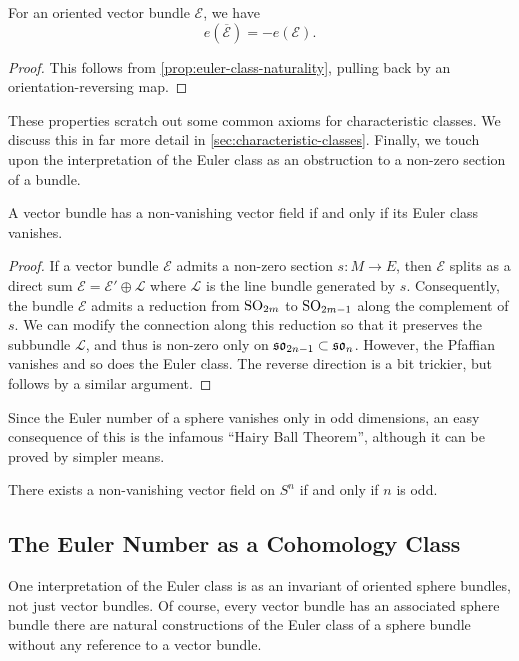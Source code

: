 \begin{proposition}
  For an oriented vector bundle $\mathcal{E}$, we have
  \[
    e(\overline{\mathcal{E}}) = -e(\mathcal{E}).
  \]
\end{proposition}
\begin{proof}
  This follows from \cref{prop:euler-class-naturality}, pulling back by an orientation-reversing map.
\end{proof}

These properties scratch out some common axioms for characteristic classes. We discuss this in far more detail in \cref{sec:characteristic-classes}. 
Finally, we touch upon the interpretation of the Euler class as an obstruction to a non-zero section of a bundle. 

\begin{proposition}
  A vector bundle has a non-vanishing vector field if and only if its Euler class vanishes.
\end{proposition}
\begin{proof}
If a vector bundle $\mathcal{E}$ admits a non-zero section $s : M \to E$, then $\mathcal{E}$ splits as a direct sum $\mathcal{E}=\mathcal{E}'\oplus \mathcal{L}$ where $\mathcal{L}$ is the line bundle generated by $s$. Consequently, the bundle $\mathcal{E}$ admits a reduction from $\mathrm{SO}_{2m}$ to $\mathrm{SO}_{2m-1}$ along the complement of $s$. We can modify the connection along this reduction so that it preserves the subbundle $\mathcal{L}$, and thus is non-zero only on $\mathfrak{so}_{2n-1}\subset \mathfrak{so}_n$. However, the Pfaffian vanishes and so does the Euler class. The reverse direction is a bit trickier, but follows by a similar argument.
\end{proof}


Since the Euler number of a sphere vanishes only in odd dimensions, an easy consequence of this is the infamous ``Hairy Ball Theorem'', although it can be proved by simpler means. 

\begin{theorem}
  There exists a non-vanishing vector field on $S^n$ if and only if $n$ is odd.
\end{theorem}

\subsection{The Euler Number as a Cohomology Class}\label{sec:euler-number-cohomology}

One interpretation of the Euler class is as an invariant of oriented sphere bundles, not just vector bundles. Of course, every vector bundle has an associated sphere bundle there are natural constructions of the Euler class of a sphere bundle without any reference to a vector bundle. 

